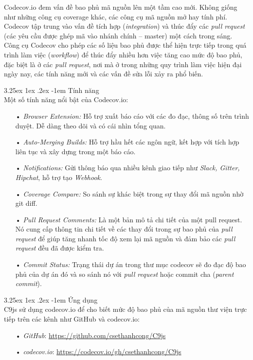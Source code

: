 \documentclass[12pt,a4paper,twoside]{article}
\makeatletter
\newcommand{\myparagraph}[1]{\paragraph{#1}\mbox{}\\} %
\renewcommand\paragraph{\@startsection{paragraph}{5}{\z@}%
  {3.25ex \@plus1ex \@minus.2ex}%
  {-1em}%
  {\normalfont\normalsize\bfseries}}
\makeatother
\begin{document}
\begin{enumerate}
Codecov.io đem vấn đề bao phủ mã nguồn lên một tầm cao mới. Không giống như những công cụ coverage khác, các công cụ mã nguồn mở hay tính phí. Codecov tập trung vào vấn đề tích hợp (\textit{integration}) và thúc đẩy các \textit{pull request} (các yêu cầu được ghép mã vào nhánh chính – \textsf{master}) một cách trong sáng. Công cụ Codecov cho phép các số liệu bao phủ được thể hiện trực tiếp trong quá trình làm việc (\textit{workflow}) để thúc đẩy nhiều hơn việc tăng cao mức độ bao phủ, đặc biệt là ở các \textit{pull request}, nơi mà ở trong những quy trình làm việc hiện đại ngày nay, các tính năng mới và các vấn đề sửa lỗi xảy ra phổ biến.
\end{enumerate}

\myparagraph{Tính năng}
Một số tính năng nổi bật của Codecov.io: 
\begin{itemize}
\item[•] \emph{Browser Extension:} Hỗ trợ xuất báo cáo với các đo đạc, thông số trên trình duyệt. Dễ dàng theo dõi và có cái nhìn tổng quan.
\item[•] \emph{Auto-Merging Builds:} Hỗ trợ hầu hết các ngôn ngữ, kết hợp với tích hợp liên tục và xây dựng trong một báo cáo.
\item[•] \emph{Notifications:} Gửi thông báo qua nhiều kênh giao tiếp như \textit{Slack, Gitter, Hipchat}, hỗ trợ tạo \textit{Webhook}.
\item[•] \emph{Coverage Compare:} So sánh sự khác biệt trong sự thay đổi mã nguồn nhờ \textsf{git diff}.
\item[•] \emph{Pull Request Comments:} Là một bản mô tả chi tiết của một pull request. Nó cung cấp thông tin chi tiết về các thay đổi trong sự bao phủ của \textit{pull request} để giúp tăng nhanh tốc độ xem lại mã nguồn và đảm bảo các \textit{pull request} đều đã được kiểm tra.
\item[•] \emph{Commit Status:} Trạng thái dự án trong thư mục codecov sẽ đo đạc độ bao phủ của dự án đó và so sánh nó với \textit{pull request} hoặc commit cha (\textit{parent commit}).
\end{itemize}

\myparagraph{Ứng dụng}
C9js sử dụng codecov.io để cho biết mức độ bao phủ của mã nguồn thư viện trực tiếp trên các kênh như GitHub và codecov.io:

\begin{itemize}
\item[•] \emph{GitHub}: \url{https://github.com/csethanhcong/C9js}
\item[•] \emph{codecov.io}: \url{https://codecov.io/gh/csethanhcong/C9js}
\end{itemize}
\end{document}
